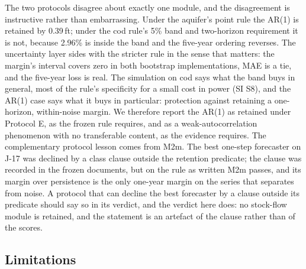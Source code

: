 \documentclass[preprint,11pt,authoryear]{elsarticle}
\theoremstyle{definition}
\theoremstyle{remark}
\begin{document}
The two protocols disagree about exactly one module, and the disagreement is instructive rather than embarrassing. Under the aquifer's point rule the AR(1) is retained by 0.39\,ft; under the cod rule's 5\% band and two-horizon requirement it is not, because 2.96\% is inside the band and the five-year ordering reverses. The uncertainty layer sides with the stricter rule in the sense that matters: the margin's interval covers zero in both bootstrap implementations, MAE is a tie, and the five-year loss is real. The simulation on cod says what the band buys in general, most of the rule's specificity for a small cost in power (SI S8), and the AR(1) case says what it buys in particular: protection against retaining a one-horizon, within-noise margin. We therefore report the AR(1) as retained under Protocol E, as the frozen rule requires, and as a weak-autocorrelation phenomenon with no transferable content, as the evidence requires. The complementary protocol lesson comes from M2m. The best one-step forecaster on J-17 was declined by a class clause outside the retention predicate; the clause was recorded in the frozen documents, but on the rule as written M2m passes, and its margin over persistence is the only one-year margin on the series that separates from noise. A protocol that can decline the best forecaster by a clause outside its predicate should say so in its verdict, and the verdict here does: no stock-flow module is retained, and the statement is an artefact of the clause rather than of the scores.

\subsection{Limitations}\label{sec:limits}
\end{document}
